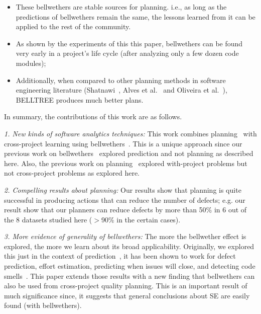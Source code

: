 \documentclass[10pt,journal,compsoc]{IEEEtran}
\newcommand{\bi}{\begin{itemize}} %
\newcommand{\ei}{\end{itemize}}
\begin{document}
    \bi
        \item These bellwethers are stable sources for planning. i.e., as long
        as the predictions of bellwethers remain the same, the lessons
        learned from it can be applied to the rest of the community.  
        \item As shown by the experiments of this this paper, bellwethers  can be found very early in a project’s life cycle (after
        analyzing only a few dozen code modules);
        \item Additionally, when compared to other planning methods in software engineering literature (Shatnawi~\cite{shatnawi}, Alves et al.~\cite{alves} and Oliveira et al.~\cite{oliveira}), BELLTREE produces much better plans.
    \ei

In summary, the contributions of this work are as follows.

\textit{1. New kinds of software analytics techniques:} This work combines planning~\cite{krishna17a} with cross-project learning using bellwethers~\cite{krishna16}. This is a unique approach since our previous work on bellwethers~\cite{krishna16, krishna17b} explored prediction and not planning as described here. Also, the previous work on planning~\cite{krishna17a} explored with-project problems but not cross-project problems as explored here. 

\textit{2. Compelling results about planning:} Our results show   that planning is quite successful in producing actions that can reduce the number of defects; e.g. our result show that our planners can reduce defects by more than 50\% in 6 out of the 8 datasets studied here ($>$90\% in the certain cases).

\textit{3. More evidence of generality of bellwethers:} The more the bellwether effect is explored, the more we learn about its broad
applicability. Originally, we explored this just in the context of prediction~\cite{krishna16},
it has been shown to work for defect prediction, effort estimation, predicting when issues will close, and detecting code smells~\cite{krishna17b}. This paper extends those results with a new finding that bellwethers can also be used from cross-project quality planning. This is an important result of much significance since, it suggests that general conclusions about SE are easily found (with bellwethers).

 
\end{document}
